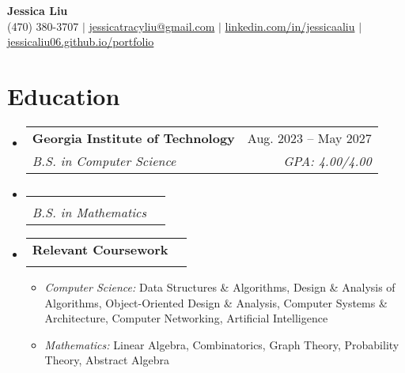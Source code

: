 \documentclass[letterpaper,11pt]{article}
\makeatletter
\newcommand{\resumeItem}[1]{
  \item\small{
    {#1 \vspace{-2pt}}
  }
}
\newcommand{\resumeSubheading}[4]{
  \vspace{-2pt}\item
    \begin{tabular*}{0.99\textwidth}[t]{l@{\extracolsep{\fill}}r}
      \textbf{#1} & #2 \\
      \textsl{\small#3} & \textsl{\small #4} \\
    \end{tabular*}\vspace{-7pt}
}
\newcommand{\resumeSubHeadingListStart}{\begin{itemize}[leftmargin=*, label={}]}
\newcommand{\resumeSubHeadingListEnd}{\end{itemize}}
\newcommand{\resumeItemListStart}{\begin{itemize}[leftmargin=*, labelsep=0.75em]}
\newcommand{\resumeItemListEnd}{\end{itemize}\vspace{-7pt}}
\makeatother
\begin{document}

\begin{center}
    \textbf{\Huge Jessica Liu} \\ \vspace{1pt}
    \small 
        (470) 380-3707 $|$
        \href{mailto:jessicatracyliu@gmail.com}{jessicatracyliu@gmail.com} $|$
        \href{https://www.linkedin.com/in/jessicaaliu/}{linkedin.com/in/jessicaaliu} $|$
        \href{https://jessicaliu06.github.io/portfolio}{jessicaliu06.github.io/portfolio}
\end{center}

\vspace{-0.75cm}
\section{Education}
  \resumeSubHeadingListStart
    \resumeSubheading
      {Georgia Institute of Technology}{Aug. 2023 -- May 2027}
      {B.S. in Computer Science}{GPA: 4.00/4.00}
    \vspace{-1.15cm}
    \resumeSubheading
      {}{}
      {B.S. in Mathematics}{}

    \vspace{-0.5cm}
    \resumeSubheading
      {\small Relevant Coursework}{}
      {}{}
      \vspace{-0.7cm}
      \resumeItemListStart
        \resumeItem
            {\textsl{Computer Science:} Data Structures \& Algorithms, Design \& Analysis of Algorithms, Object-Oriented Design \& Analysis, Computer Systems \& Architecture, Computer Networking, Artificial Intelligence}
        \resumeItem
            {\textsl{Mathematics:} Linear Algebra, Combinatorics, Graph Theory, Probability Theory, Abstract Algebra}
      \resumeItemListEnd
  \resumeSubHeadingListEnd

\end{document}
